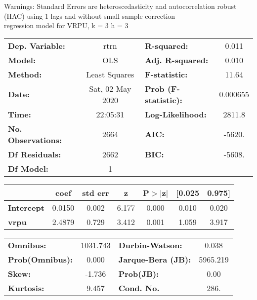 Warnings: \newline
 [1] Standard Errors are heteroscedasticity and autocorrelation robust (HAC) using 1 lags and without small sample correction\\ 

regression model for VRPU, k = 3 h = 3\begin{center}
\begin{tabular}{lclc}
\toprule
\textbf{Dep. Variable:}    &       rtrn       & \textbf{  R-squared:         } &     0.011   \\
\textbf{Model:}            &       OLS        & \textbf{  Adj. R-squared:    } &     0.010   \\
\textbf{Method:}           &  Least Squares   & \textbf{  F-statistic:       } &     11.64   \\
\textbf{Date:}             & Sat, 02 May 2020 & \textbf{  Prob (F-statistic):} &  0.000655   \\
\textbf{Time:}             &     22:05:31     & \textbf{  Log-Likelihood:    } &    2811.8   \\
\textbf{No. Observations:} &        2664      & \textbf{  AIC:               } &    -5620.   \\
\textbf{Df Residuals:}     &        2662      & \textbf{  BIC:               } &    -5608.   \\
\textbf{Df Model:}         &           1      & \textbf{                     } &             \\
\bottomrule
\end{tabular}
\begin{tabular}{lcccccc}
                   & \textbf{coef} & \textbf{std err} & \textbf{z} & \textbf{P$> |$z$|$} & \textbf{[0.025} & \textbf{0.975]}  \\
\midrule
\textbf{Intercept} &       0.0150  &        0.002     &     6.177  &         0.000        &        0.010    &        0.020     \\
\textbf{vrpu}      &       2.4879  &        0.729     &     3.412  &         0.001        &        1.059    &        3.917     \\
\bottomrule
\end{tabular}
\begin{tabular}{lclc}
\textbf{Omnibus:}       & 1031.743 & \textbf{  Durbin-Watson:     } &    0.038  \\
\textbf{Prob(Omnibus):} &   0.000  & \textbf{  Jarque-Bera (JB):  } & 5965.219  \\
\textbf{Skew:}          &  -1.736  & \textbf{  Prob(JB):          } &     0.00  \\
\textbf{Kurtosis:}      &   9.457  & \textbf{  Cond. No.          } &     286.  \\
\bottomrule
\end{tabular}
\end{center}

